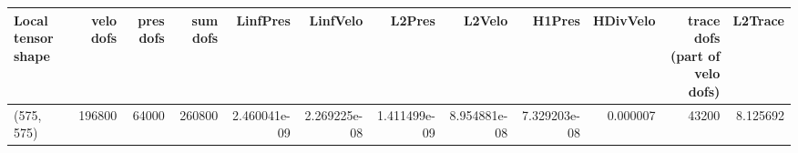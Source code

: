 \begin{tabular}{lrrrrrrrrrrr}
\toprule
Local tensor shape &  velo dofs &  pres dofs &  sum dofs &     LinfPres &     LinfVelo &       L2Pres &       L2Velo &       H1Pres &  HDivVelo &  trace dofs (part of velo dofs) &  L2Trace \\
\midrule
        (575, 575) &     196800 &      64000 &    260800 & 2.460041e-09 & 2.269225e-08 & 1.411499e-09 & 8.954881e-08 & 7.329203e-08 &  0.000007 &                           43200 & 8.125692 \\
\bottomrule
\end{tabular}
